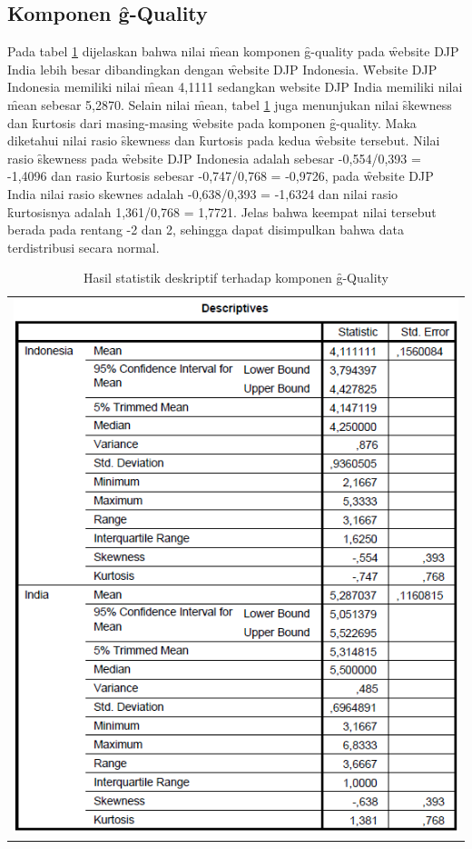 \subsection{Komponen \f{g-Quality}}
Pada tabel \ref{tab:descgq} dijelaskan bahwa nilai \f{mean} komponen \f{g-quality} pada \f{website} DJP India lebih besar dibandingkan dengan \f{website} DJP Indonesia. \f{Website} DJP Indonesia memiliki nilai \f{mean} 4,1111 sedangkan website DJP India memiliki nilai \f{mean} sebesar 5,2870. Selain nilai \f{mean}, tabel \ref{tab:descgq} juga menunjukan nilai \f{skewness} dan \f{kurtosis} dari masing-masing \f{website} pada komponen \f{g-quality}. Maka diketahui nilai rasio \f{skewness} dan \f{kurtosis} pada kedua \f{website} tersebut. Nilai rasio \f{skewness} pada \f{website} DJP Indonesia adalah sebesar -0,554/0,393 = -1,4096 dan rasio \f{kurtosis} sebesar -0,747/0,768 = -0,9726, pada \f{website} DJP India nilai rasio skewnes adalah -0,638/0,393 = -1,6324 dan nilai rasio \f{kurtosis}nya adalah 1,361/0,768 = 1,7721. Jelas bahwa keempat nilai tersebut berada pada rentang -2 dan 2, sehingga dapat disimpulkan bahwa data terdistribusi secara normal. 
\begin{table}
	\centering
	\caption{Hasil statistik deskriptif terhadap komponen \f{g-Quality}}
	\label{tab:descgq}
	\begin{tabular}{c}
		\includegraphics[width=\textwidth]
		{pics/ordinaldescGQ.PNG}
	\end{tabular}
\end{table}
